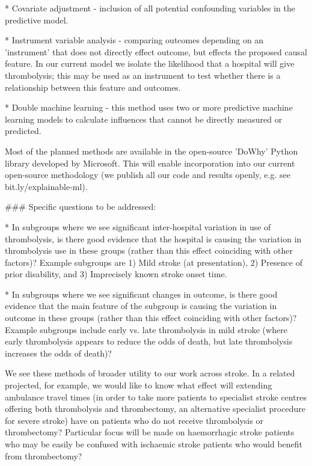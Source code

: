 \begin{markdown}
    * Covariate adjustment - inclusion of all potential confounding variables in the predictive model.
    
    * Instrument variable analysis - comparing outcomes depending on an 'instrument' that does not directly effect outcome, but effects the proposed causal feature. In our current model we isolate the likelihood that a hospital will give thrombolysis; this may be used as an instrument to test whether there is a relationship between this feature and outcomes.
    
    * Double machine learning - this method uses two or more predictive machine learning models to calculate influences that cannot be directly measured or predicted.

Most of the planned methods are available in the open-source 'DoWhy' Python library developed by Microsoft. This will enable incorporation into our current open-source methodology (we publish all our code and results openly, e.g. see bit.ly/explainable-ml).
 
### Specific questions to be addressed:

* In subgroups where we see significant inter-hospital variation in use of thrombolysis, is there good evidence that the hospital is causing the variation in thrombolysis use in these groups (rather than this effect coinciding with other factors)? Example subgroups are 1) Mild stroke (at presentation), 2) Presence of prior disability, and 3) Imprecisely known stroke onset time.

* In subgroups where we see significant changes in outcome, is there good evidence that the main feature of the subgroup is causing the variation in outcome in these groups (rather than this effect coinciding with other factors)? Example subgroups include early vs. late thrombolysis in mild stroke (where early thrombolysis appears to reduce the odds of death, but late thrombolysis increases the odds of death)?

We see these methods of broader utility to our work across stroke. In a related projected, for example, we would like to know what effect will extending ambulance travel times (in order to take more patients to specialist stroke centres offering both thrombolysis and thrombectomy, an alternative specialist procedure for severe stroke) have on patients who do not receive thrombolysis or thrombectomy? Particular focus will be made on haemorrhagic stroke patients who may be easily be confused with ischaemic stroke patients who would benefit from thrombectomy?


\end{markdown}
